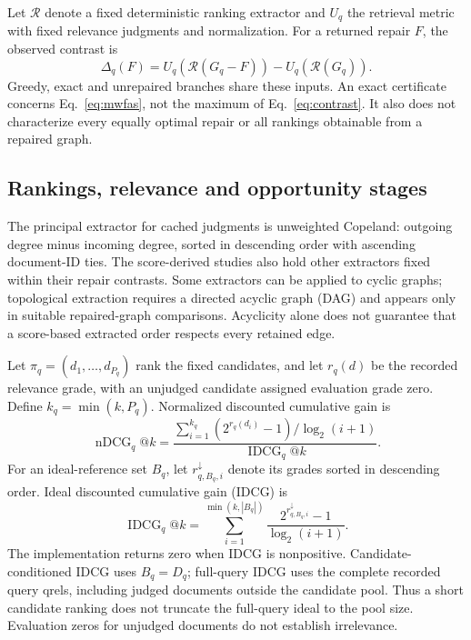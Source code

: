 \documentclass[pdflatex,iicol,sn-basic,Numbered]{sn-jnl}
\begin{document}
Let $\mathcal R$ denote a fixed deterministic ranking extractor and $U_q$ the retrieval metric with fixed relevance judgments and normalization. For a returned repair $F$, the observed contrast is
\begin{equation}
\Delta_q(F)=U_q\!\left(\mathcal R(G_q-F)\right)-U_q\!\left(\mathcal R(G_q)\right).
\label{eq:contrast}
\end{equation}
Greedy, exact and unrepaired branches share these inputs. An exact certificate concerns Eq.~\eqref{eq:mwfas}, not the maximum of Eq.~\eqref{eq:contrast}. It also does not characterize every equally optimal repair or all rankings obtainable from a repaired graph.

\subsection{Rankings, relevance and opportunity stages}
The principal extractor for cached judgments is unweighted Copeland: outgoing degree minus incoming degree, sorted in descending order with ascending document-ID ties. The score-derived studies also hold other extractors fixed within their repair contrasts. Some extractors can be applied to cyclic graphs; topological extraction requires a directed acyclic graph (DAG) and appears only in suitable repaired-graph comparisons. Acyclicity alone does not guarantee that a score-based extracted order respects every retained edge.

Let $\pi_q=(d_1,\ldots,d_{P_q})$ rank the fixed candidates, and let $r_q(d)$ be the recorded relevance grade, with an unjudged candidate assigned evaluation grade zero. Define $k_q=\min(k,P_q)$. Normalized discounted cumulative gain is
\begin{equation}
\operatorname{nDCG}_q@k=
\frac{\sum_{i=1}^{k_q}(2^{r_q(d_i)}-1)/\log_2(i+1)}{\operatorname{IDCG}_q@k}.
\label{eq:ndcg}
\end{equation}
For an ideal-reference set $B_q$, let $r^\downarrow_{q,B_q,i}$ denote its grades sorted in descending order. Ideal discounted cumulative gain (IDCG) is
\begin{equation}
\operatorname{IDCG}_q@k=\sum_{i=1}^{\min(k,|B_q|)}
\frac{2^{r^\downarrow_{q,B_q,i}}-1}{\log_2(i+1)}.
\label{eq:idcg}
\end{equation}
The implementation returns zero when IDCG is nonpositive. Candidate-conditioned IDCG uses $B_q=D_q$; full-query IDCG uses the complete recorded query qrels, including judged documents outside the candidate pool. Thus a short candidate ranking does not truncate the full-query ideal to the pool size. Evaluation zeros for unjudged documents do not establish irrelevance.
\end{document}
